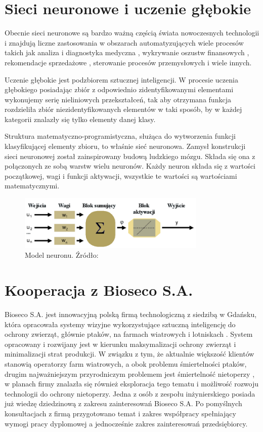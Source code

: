 \documentclass{sprz}
\begin{document}
\section{Sieci neuronowe i uczenie głębokie}
Obecnie sieci neuronowe są bardzo ważną częścią świata nowoczesnych technologii i znajdują liczne zastosowania w obszarach automatyzujących wiele procesów takich jak analiza i diagnostyka medyczna \cite{diabetes}, wykrywanie oszustw finansowych \cite{laundring}, rekomendacje sprzedażowe \cite{fashion}, sterowanie procesów przemysłowych \cite{irigation} i wiele innych.

Uczenie głębokie jest podzbiorem sztucznej inteligencji. W procesie uczenia głębokiego posiadając zbiór z odpowiednio zidentyfikowanymi elementami wykonujemy serię nieliniowych przekształceń, tak aby otrzymana funkcja rozdzieliła zbiór niezidentyfikowanych elementów w taki sposób, by w każdej kategorii znalazły się tylko elementy danej klasy.

Struktura matematyczno-programistyczna, służąca do wytworzenia funkcji klasyfikującej elementy zbioru, to właśnie sieć neuronowa. Zamysł konstrukcji sieci neuronowej został zainspirowany budową ludzkiego mózgu. Składa się ona z połączonych ze sobą warstw wielu neuronów. Każdy neuron składa się z wartości początkowej, wagi i funkcji aktywacji, wszystkie te wartości są wartościami matematycznymi. 

\begin{figure}[h]
  \centering
  \includegraphics[width=0.8\textwidth]{sprz/neuron}
  \caption{Model neuronu. Źródło: \cite{neuron}}
  \label{img:neuron}
\end{figure} 

\section{Kooperacja z Bioseco S.A.}
Bioseco S.A. jest innowacyjną polską firmą technologiczną z siedzibą w Gdańsku, która opracowała systemy wizyjne wykorzystujące sztuczną inteligencję do ochrony zwierząt, głównie ptaków, na farmach wiatrowych i lotniskach \cite{bioseco1} \cite{bioseco2}. System opracowany i rozwijany jest w kierunku maksymalizacji ochrony zwierząt i minimalizacji strat produkcji. W związku z tym, że aktualnie większość klientów stanowią operatorzy farm wiatrowych, a obok problemu śmiertelności ptaków, drugim najważniejszym przyrodniczym problemem jest śmiertelność nietoperzy \cite{birds-and-bats}, w planach firmy znalazła się również eksploracja tego tematu i możliwość rozwoju technologii do ochrony nietoperzy. Jedna z osób z zespołu inżynierskiego posiada już wiedzę dziedzinową z zakresu zainteresowań Bioseco S.A. Po pomyślnych konsultacjach z firmą przygotowano temat i zakres współpracy spełniający wymogi pracy dyplomowej a jednocześnie zakres zainteresowań przedsiębiorcy.
\end{document}
